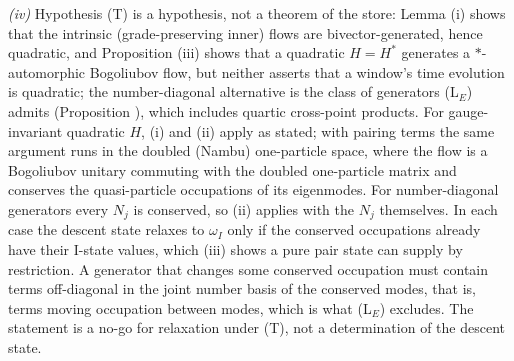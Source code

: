 \emph{(iv)} Hypothesis (T) is a hypothesis, not a theorem of the store: Lemma (i) shows that the intrinsic (grade-preserving inner) flows are bivector-generated, hence quadratic, and Proposition (iii) shows that a quadratic $H = H^{*}$ generates a $*$-automorphic Bogoliubov flow, but neither asserts that a window's time evolution is quadratic; the number-diagonal alternative is the class of generators (L$_E$) admits (Proposition ), which includes quartic cross-point products. For gauge-invariant quadratic $H$, (i) and (ii) apply as stated; with pairing terms the same argument runs in the doubled (Nambu) one-particle space, where the flow is a Bogoliubov unitary commuting with the doubled one-particle matrix and conserves the quasi-particle occupations of its eigenmodes. For number-diagonal generators every $N_{j}$ is conserved, so (ii) applies with the $N_{j}$ themselves. In each case the descent state relaxes to $\omega_{I}$ only if the conserved occupations already have their I-state values, which (iii) shows a pure pair state can supply by restriction. A generator that changes some conserved occupation must contain terms off-diagonal in the joint number basis of the conserved modes, that is, terms moving occupation between modes, which is what (L$_E$) excludes. The statement is a no-go for relaxation under (T), not a determination of the descent state.
